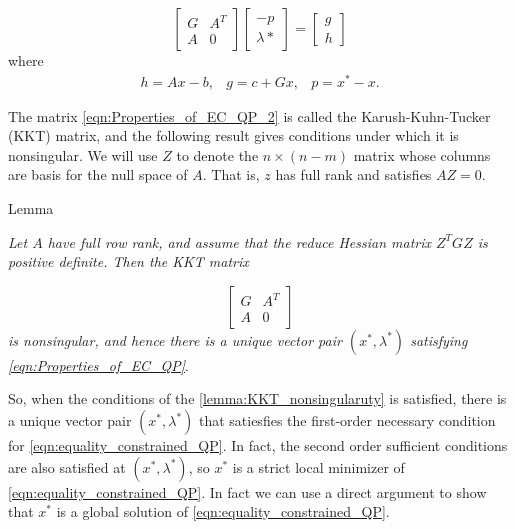 \begin{equation}
\begin{bmatrix}
  	G & A^T \\
    A & 0
  \end{bmatrix}
  \begin{bmatrix}
  	-p \\
    \lambda{*}
  \end{bmatrix}
  =
  \begin{bmatrix}
  	g \\
    h
  \end{bmatrix}	
  \label{eqn:Properties_of_EC_QP_2}
\end{equation}
where
\begin{equation}
\begin{aligned}
h= Ax-b, & g = c+Gx, & p = x^* - x.
\end{aligned}
\label{eqn:Properties_of_EC_QP_3}	
\end{equation}

The matrix \ref{eqn:Properties_of_EC_QP_2} is called the Karush-Kuhn-Tucker (KKT) matrix, and the following result gives conditions under which it is nonsingular. We will use $Z$ to denote the $n \times (n-m)$ matrix whose columns are basis for the null space of $A$. That is, $z$ has full  rank and satisfies $AZ=0$.

\begin{mybox}{Lemma}
\begin{lemma}
\textit{Let $A$ have full row rank, and assume that the reduce Hessian matrix $Z^TGZ$ is positive definite. Then the KKT matrix}

\begin{equation}
	\begin{bmatrix}
  		G & A^T \\
    	A & 0
    \end{bmatrix}
\label{eqn:Properties_of_EC_QP_4}	
\end{equation}
\textit{is nonsingular, and hence there is a unique vector pair $(x^*, \lambda^*)$ satisfying \ref{eqn:Properties_of_EC_QP}}.	
\label{lemma:KKT_nonsingularuty}
\end{lemma}
\end{mybox}

So, when the conditions of the \ref{lemma:KKT_nonsingularuty} is satisfied, there is a unique vector pair $(x^*, \lambda^*)$ that satiesfies the first-order necessary condition for \ref{eqn:equality_constrained_QP}. In fact, the second order sufficient conditions are also satisfied at $(x^*, \lambda^*)$, so $x^*$ is a strict local minimizer of \ref{eqn:equality_constrained_QP}. In fact we can use a direct argument to show that $x^*$ is a global solution of \ref{eqn:equality_constrained_QP}.

